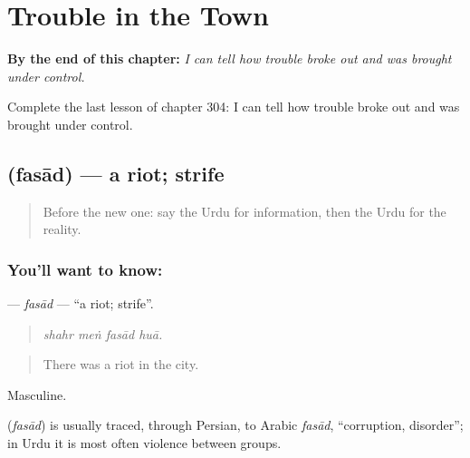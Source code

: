 
\chapter{Trouble in the Town}
\label{ch:ur-trouble-in-the-town}

\begin{chapteropening}
\textbf{By the end of this chapter:} \emph{I can tell how trouble broke out and was brought under control.}

Complete the last lesson of chapter 304: I can tell how trouble broke out and was brought under control.
\end{chapteropening}

\section[\texorpdfstring{\ur{فساد} (fasād)}{فساد (fasād)}]{ (fasād) — a riot; strife}

\label{lesson:UR-C304-fasad}



\begin{quote}
Before the new one: say the Urdu for information, then the Urdu for the reality.
\end{quote}

\subsection*{You'll want to know: }
\textbf{} — \emph{fasād} — \textquotedblleft{}a riot; strife\textquotedblright{}.

\begin{quote}
   
\end{quote}

\begin{quote}
\emph{shahr meṅ fasād huā.}
\end{quote}

\begin{quote}
There was a riot in the city.
\end{quote}

Masculine.

\begin{cousinweb}
\textbf{} (\emph{fasād}) is usually traced, through Persian, to Arabic \emph{fasād}, \textquotedblleft{}corruption, disorder\textquotedblright{}; in Urdu it is most often violence between groups.
\end{cousinweb}

